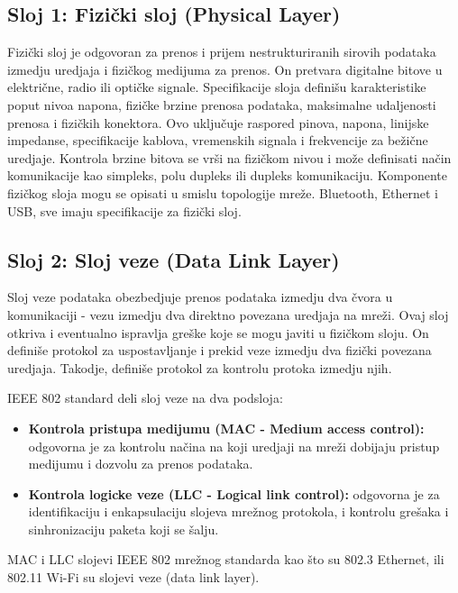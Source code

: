 \documentclass[a4paper,12pt, master]{etf}
\begin{document}
	\subsection{Sloj 1: Fizi\v{c}ki sloj (Physical Layer)}

	Fizi\v{c}ki sloj je odgovoran za prenos i prijem nestrukturiranih sirovih
	podataka izmedju uredjaja i fizi\v{c}kog medijuma za prenos. On pretvara
	digitalne bitove u elektri\v{c}ne, radio ili opti\v{c}ke signale.
	Specifikacije sloja defini\v{s}u karakteristike poput nivoa napona,
	fizi\v{c}ke brzine prenosa podataka, maksimalne udaljenosti prenosa i
	fizi\v{c}kih konektora. Ovo	uklju\v{c}uje raspored pinova, napona, linijske
	impedanse, specifikacije kablova, vremenskih signala i frekvencije za
	be\v{z}i\v{c}ne uredjaje. Kontrola brzine bitova se vr\v{s}i na fizi\v{c}kom
	nivou i mo\v{z}e definisati na\v{c}in komunikacije kao simpleks, polu
	dupleks ili dupleks	komunikaciju. Komponente fizi\v{c}kog sloja mogu se
	opisati u smislu topologije mre\v{z}e. Bluetooth, Ethernet i USB, sve imaju
	specifikacije za fizi\v{c}ki sloj.

	\subsection{Sloj 2: Sloj veze (Data Link Layer)}

	Sloj veze podataka obezbedjuje prenos podataka izmedju dva \v{c}vora u
	komunikaciji - vezu	izmedju dva direktno povezana uredjaja na mre\v{z}i.
	Ovaj sloj otkriva i eventualno ispravlja gre\v{s}ke koje se mogu javiti u
	fizi\v{c}kom sloju. On defini\v{s}e protokol za uspostavljanje i prekid
	veze izmedju dva fizi\v{c}ki povezana uredjaja. Takodje, defini\v{s}e
	protokol za kontrolu protoka izmedju njih.

	IEEE 802 standard deli sloj veze na dva podsloja:
	\begin{itemize}
		\item \textbf{Kontrola pristupa medijumu (MAC - Medium access control):}
		odgovorna je za kontrolu na\v{c}ina na koji uredjaji na mre\v{z}i
		dobijaju pristup medijumu i	dozvolu za prenos podataka.
		\item \textbf{Kontrola logicke veze (LLC - Logical link control):}
		odgovorna je za identifikaciju i enkapsulaciju slojeva mre\v{z}nog
		protokola, i kontrolu gre\v{s}aka i sinhronizaciju paketa koji se
		\v{s}alju.
	\end{itemize}

	MAC i LLC slojevi IEEE 802 mre\v{z}nog standarda kao \v{s}to su 802.3
	Ethernet, ili 802.11 Wi-Fi su slojevi veze (data link layer).
\end{document}
